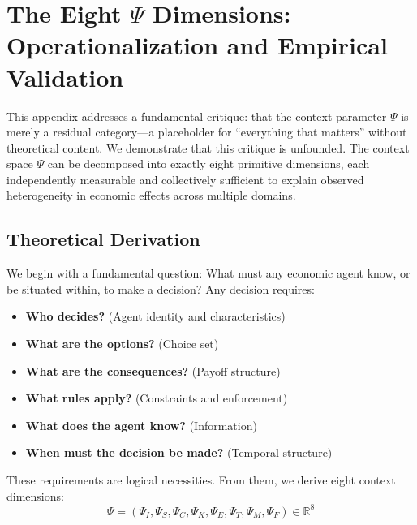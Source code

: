 \documentclass[12pt,a4paper]{article}
\begin{document}
\section{The Eight $\Psi$ Dimensions: Operationalization and Empirical Validation}
\label{app:psi-dimensions}

This appendix addresses a fundamental critique: that the context parameter $\Psi$ is merely a residual category---a placeholder for ``everything that matters'' without theoretical content. We demonstrate that this critique is unfounded. The context space $\Psi$ can be decomposed into exactly eight primitive dimensions, each independently measurable and collectively sufficient to explain observed heterogeneity in economic effects across multiple domains.

\subsection{Theoretical Derivation}

We begin with a fundamental question: What must any economic agent know, or be situated within, to make a decision? Any decision requires:
\begin{itemize}
    \item \textbf{Who decides?} (Agent identity and characteristics)
    \item \textbf{What are the options?} (Choice set)
    \item \textbf{What are the consequences?} (Payoff structure)
    \item \textbf{What rules apply?} (Constraints and enforcement)
    \item \textbf{What does the agent know?} (Information)
    \item \textbf{When must the decision be made?} (Temporal structure)
\end{itemize}

These requirements are logical necessities. From them, we derive eight context dimensions:
\begin{equation}
\Psi = (\Psi_I, \Psi_S, \Psi_C, \Psi_K, \Psi_E, \Psi_T, \Psi_M, \Psi_F) \in \mathbb{R}^8
\label{eq:psi-vector-appv}
\end{equation}
\end{document}
